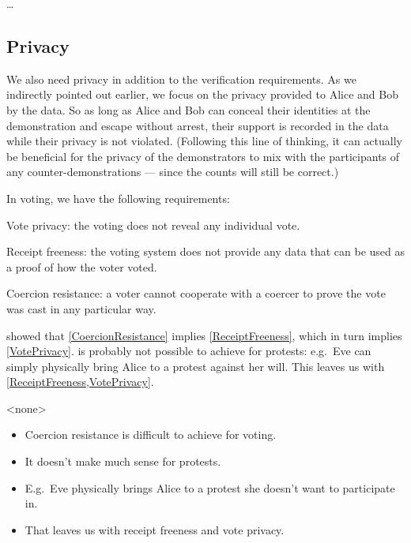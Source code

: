 \dots

\subsection{Privacy}%
\label{Privacy}

We also need privacy in addition to the verification requirements.
As we indirectly pointed out earlier, we focus on the privacy provided to Alice 
and Bob by the data.
So as long as Alice and Bob can conceal their identities at the demonstration 
and escape without arrest, their support is recorded in the data while their 
privacy is not violated.
(Following this line of thinking, it can actually be beneficial for the privacy 
of the demonstrators to mix with the participants of any counter-demonstrations 
--- since the counts will still be correct.)

In voting, we have the following requirements:
\begin{frame}
\begin{requirements}[P]
\item\label{VotePrivacy} Vote privacy: the voting does not reveal any 
  individual vote.
\item\label{ReceiptFreeness} Receipt freeness: the voting system does not 
  provide any data that can be used as a proof of how the voter voted.
\item\label{CoercionResistance} Coercion resistance: a voter cannot cooperate 
  with a coercer to prove the vote was cast in any particular way.
\end{requirements}
\pause{}
\end{frame}
\Textcite{VerifyingPrivacyPropertiesOfVotingProtocols} showed that 
\cref{CoercionResistance} implies \cref{ReceiptFreeness}, which in turn implies
\cref{VotePrivacy}.
 is probably not possible to achieve for protests:
e.g.\ Eve can simply physically bring Alice to a protest against her will.
This leaves us with \cref{ReceiptFreeness,VotePrivacy}.

\mode<none>{%
\begin{frame}
  \begin{remark}
    \begin{itemize}
      \item Coercion resistance is difficult to achieve for voting.
      \item It doesn't make much sense for protests.
      \item E.g.\ Eve physically brings Alice to a protest she doesn't want to 
        participate in.
      \item That leaves us with receipt freeness and vote privacy.
    \end{itemize}
  \end{remark}
\end{frame}
}

